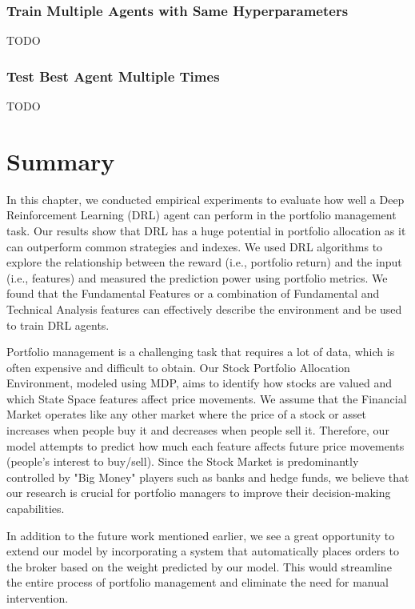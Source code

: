 \documentclass[../xlapes02]{subfiles}
\begin{document}
    \subsubsection{Train Multiple Agents with Same Hyperparameters}\label{subsubsec:train-multiple-agents-with-same-hyperparameters}
    TODO

    \subsubsection{Test Best Agent Multiple Times}\label{subsubsec:test-best-agent-multiple-times}
    TODO


    \section{Summary}\label{sec:summary}
    In this chapter, we conducted empirical experiments to evaluate how well a Deep Reinforcement Learning (DRL) agent can perform in the portfolio management task. Our results show that DRL has a huge potential in portfolio allocation as it can outperform common strategies and indexes. We used DRL algorithms to explore the relationship between the reward (i.e., portfolio return) and the input (i.e., features) and measured the prediction power using portfolio metrics. We found that the Fundamental Features or a combination of Fundamental and Technical Analysis features can effectively describe the environment and be used to train DRL agents.

    Portfolio management is a challenging task that requires a lot of data, which is often expensive and difficult to obtain. Our Stock Portfolio Allocation Environment, modeled using MDP, aims to identify how stocks are valued and which State Space features affect price movements. We assume that the Financial Market operates like any other market where the price of a stock or asset increases when people buy it and decreases when people sell it. Therefore, our model attempts to predict how much each feature affects future price movements (people's interest to buy/sell). Since the Stock Market is predominantly controlled by "Big Money" players such as banks and hedge funds, we believe that our research is crucial for portfolio managers to improve their decision-making capabilities.

    In addition to the future work mentioned earlier, we see a great opportunity to extend our model by incorporating a system that automatically places orders to the broker based on the weight predicted by our model. This would streamline the entire process of portfolio management and eliminate the need for manual intervention.
\end{document}
